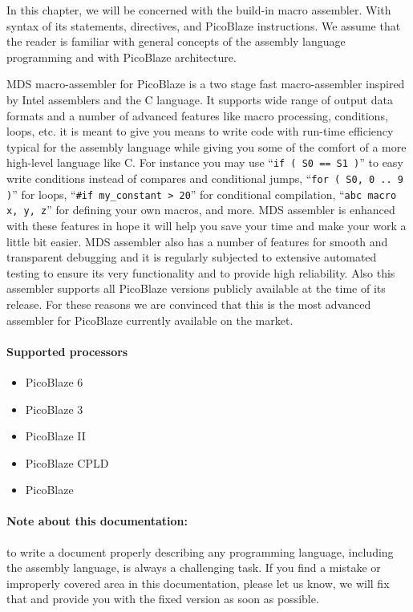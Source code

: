 \newcommand{\no}{\color{red}{\textbf{no}}}
\newcommand{\yes}{\color{black}{\textbf{yes}}}

In this chapter, we will be concerned with the build-in macro assembler. With syntax of its statements, directives, and PicoBlaze instructions. We assume that the reader is familiar with general concepts of the assembly language programming and with PicoBlaze architecture.

MDS macro-assembler for PicoBlaze is a two stage fast macro-assembler inspired by Intel assemblers and the C language. It supports wide range of output data formats and a number of advanced features like macro processing, conditions, loops, etc. it is meant to give you means to write code with run-time efficiency typical for the assembly language while giving you some of the comfort of a more high-level language like C. For instance you may use ``\verb'if ( S0 == S1 )''' to easy write conditions instead of compares and conditional jumps, ``\verb'for ( S0, 0 .. 9 )''' for loops, ``\verb'#if my_constant > 20''' for conditional compilation, ``\verb'abc macro x, y, z''' for defining your own macros, and more. MDS assembler is enhanced with these features in hope it will help you save your time and make your work a little bit easier. MDS assembler also has a number of features for smooth and transparent debugging and it is regularly subjected to extensive automated testing to ensure its very functionality and to provide high reliability. Also this assembler supports all PicoBlaze versions publicly available at the time of its release. For these reasons we are convinced that this is the most advanced assembler for PicoBlaze currently available on the market.

\paragraph{Supported processors}
    \begin{itemize}
        \item PicoBlaze 6
        \item PicoBlaze 3
        \item PicoBlaze II
        \item PicoBlaze CPLD
        \item PicoBlaze
    \end{itemize}

\paragraph{Note about this documentation:}
    to write a document properly describing any programming language, including the assembly language, is always a challenging task. If you find a mistake or improperly covered area in this documentation, please let us know, we will fix that and provide you with the fixed version as soon as possible.

